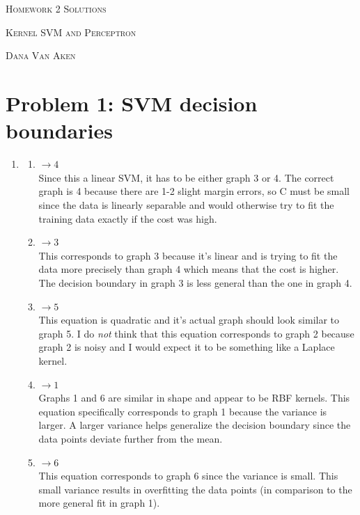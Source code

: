 \documentclass{article}
\begin{document}
\section*{}
\begin{center}
  \centerline{\textsc{\LARGE Homework 2{\if{} Solutions \else \fi}}}
  \vspace{0.5em}
  \centerline{\textsc{\Large Kernel SVM and Perceptron}}
  \vspace{1em}
  \textsc{\large Dana Van Aken} \\
\end{center}

\section*{Problem 1: SVM decision boundaries}
\begin{enumerate}
	\item
	\begin{enumerate}
		\item $\longrightarrow 4$\\
		Since this a linear SVM, it has to be either graph 3 or 4. The correct graph is 4 because there are 1-2 slight margin errors, so C must be small since the data is linearly separable and would otherwise try to fit the training data exactly if the cost was high.
		\item $\longrightarrow 3$\\
		This corresponds to graph 3 because it's linear and is trying to fit the data more precisely than graph 4 which means that the cost is higher. The decision boundary in graph 3 is less general than the one in graph 4.
		\item $\longrightarrow 5$\\
		This equation is quadratic and it's actual graph should look similar to graph 5. I do \textit{not} think that this equation corresponds to graph 2 because graph 2 is noisy and I would expect it to be something like a Laplace kernel.  
		\item $\longrightarrow 1$\\
		Graphs 1 and 6 are similar in shape and appear to be RBF kernels. This equation specifically corresponds to graph 1 because the variance is larger. A larger variance helps generalize the decision boundary since the data points deviate further from the mean.
		\item $\longrightarrow 6$\\
		This equation corresponds to graph 6 since the variance is small. This small variance results in overfitting the data points (in comparison to the more general fit in graph 1).

\end{enumerate}
\end{enumerate}
\end{document}
